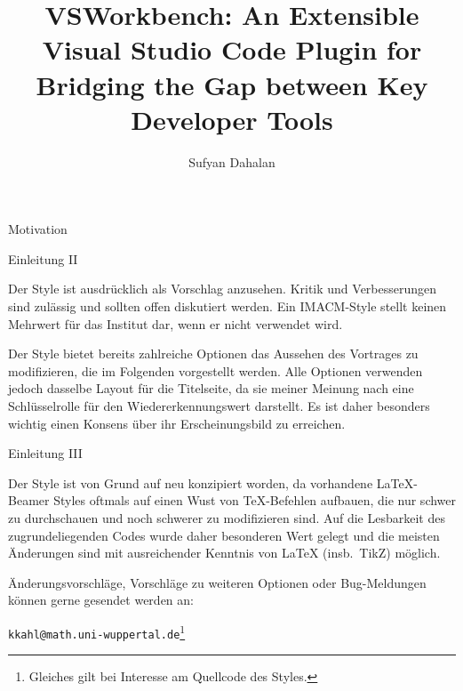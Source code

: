 \documentclass[12pt,rgb]{beamer}
\begin{document}
\title{VSWorkbench: An Extensible Visual Studio Code Plugin for Bridging the Gap between Key Developer Tools}

    \author[Sufyan Dahalan]{Sufyan Dahalan}
    \maketitle
    
    \begin{frame}[t]{Motivation}
        \parbox{\textwidth}{
        }
    \end{frame}
    
    \begin{frame}[t]{Einleitung \textrm{II}}
        \parbox{\textwidth}{
            Der Style ist ausdr\"ucklich als Vorschlag anzusehen. Kritik und Verbesserungen sind zul\"assig und sollten offen diskutiert werden. Ein IMACM-Style stellt keinen Mehrwert f\"ur das Institut dar, wenn er nicht verwendet wird.\bigskip
            
            Der Style bietet bereits zahlreiche Optionen das Aussehen des Vortrages zu modifizieren, die im Folgenden vorgestellt werden. Alle Optionen verwenden jedoch dasselbe Layout f\"ur die Titelseite, da sie meiner Meinung nach eine Schl\"usselrolle f\"ur den Wiedererkennungswert darstellt. Es ist daher besonders wichtig einen Konsens \"uber ihr Erscheinungsbild zu erreichen.
        }
    \end{frame}
    
    \begin{frame}[t]{Einleitung \textrm{III}}
        \parbox{\textwidth}{
            Der Style ist von Grund auf neu konzipiert worden, da vorhandene LaTeX-Beamer Styles oftmals auf einen Wust von TeX-Befehlen aufbauen, die nur schwer zu durchschauen und noch schwerer zu modifizieren sind. Auf die Lesbarkeit des zugrundeliegenden Codes wurde daher besonderen Wert gelegt und die meisten \"Anderungen sind mit ausreichender Kenntnis von LaTeX (insb.~TikZ) m\"oglich.\bigskip
            
            \"Anderungsvorschl\"age, Vorschl\"age zu weiteren Optionen oder Bug-Meldungen k\"onnen gerne gesendet werden an:
            \begin{center}
                \texttt{kkahl@math.uni-wuppertal.de}\footnote{Gleiches gilt bei Interesse am Quellcode des Styles.}
            \end{center}
        }
    \end{frame}
    
\end{document}

